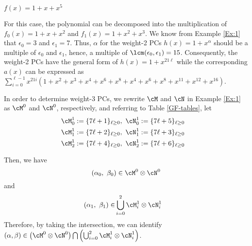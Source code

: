 \begin{example}
$f(x)=1+x+x^5$

For this case, the polynomial can be decomposed into the multiplication of $f_0(x)=1+x+x^2$ and $f_1(x)=1+x^2+x^3$.  We know from Example \ref{Ex:1} that $\epsilon_0=3$ and $\epsilon_1=7$. Thus, $\alpha$ for the weight-2 PCs $h(x) = 1+x^\alpha$ should be a multiple of $\epsilon_0$ and $\epsilon_1$, hence, a multiple of $\lcm(\epsilon_0,\epsilon_1)=15$. Consequently, the weight-2 PCs have the general  form of $h(x)=1+x^{21\ell}$ while the corresponding $a(x)$ can be expressed as $\sum_{i=0}^{\ell-1} x^{21i}(1+x^2+x^3+x^4+x^6+x^8+x^{4}+x^{6}+x^{8}+x^{11}+x^{12}+x^{16})$.


In order to determine weight-3 PCs, we rewrite $\cM$ and $\cN$ in Example \ref{Ex:1} as $\cM^0$ and $\cN^0$, respectively,
and referring to Table \ref{GF-tables}, let
\begin{align}
	\cM_0^1 &:= \{7\ell + 1\}_{\ell \geq 0},~\cN_0^1 := \{7\ell + 5\}_{\ell \geq 0}\cr
	\cM_1^1 &:= \{7\ell + 2\}_{\ell \geq 0},~\cN_1^1 := \{7\ell + 3\}_{\ell \geq 0}\cr
	\cM_2^1 &:= \{7\ell + 4\}_{\ell \geq 0},~\cN_2^1 := \{7\ell + 6\}_{\ell \geq 0}
\end{align}

Then, we have
\[
(\alpha_0,~\beta_0) \in \cM^0\otimes\cN^0 
\]
and
\begin{equation*}
\begin{split}
(\alpha_1,~\beta_1) \in &\bigcup_{i=0}^2 \cM_i^1\otimes\cN_i^1 
\end{split}
\end{equation*}
Therefore, by taking the intersection, we can identify $(\alpha,\beta) \in \left(\cM^0\otimes\cN^0\right)\bigcap\left(\bigcup_{i=0}^2 \cM_i^1\otimes\cN_i^1 \right) $.
\label{Ex:6}
\end{example}

